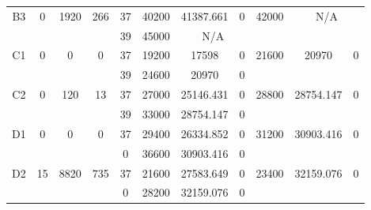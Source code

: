 \begin{sidewaystable}
\begin{tabular}{c||c|c|c||c|c|c|c||c|c|c}
         &
        
      \\
      \hline
      \multirow{2}{*}{B3} &
      \multirow{2}{*}{0} &
      \multirow{2}{*}{1920} &
      \multirow{2}{*}{266} &
      37 &
      40200 &
        41387.661 &
        0 &
      \multirow{2}{*}{42000} &
        \multicolumn{2}{c}{\multirow{2}{*}{N/A}}
      \\
      \cline{5-8}
       &
       &
       &
       &
      39 &
      45000 &
        \multicolumn{2}{|c||}{N/A} &
      
        
      \\
      \hline
      \multirow{2}{*}{C1} &
      \multirow{2}{*}{0} &
      \multirow{2}{*}{0} &
      \multirow{2}{*}{0} &
      37 &
      19200 &
        17598 &
        0 &
      \multirow{2}{*}{21600} &
        \multirow{2}{*}{20970} &
        \multirow{2}{*}{0}
      \\
      \cline{5-8}
       &
       &
       &
       &
      39 &
      24600 &
        20970 &
        0 &
      
         &
        
      \\
      \hline
      \multirow{2}{*}{C2} &
      \multirow{2}{*}{0} &
      \multirow{2}{*}{120} &
      \multirow{2}{*}{13} &
      37 &
      27000 &
        25146.431 &
        0 &
      \multirow{2}{*}{28800} &
        \multirow{2}{*}{28754.147} &
        \multirow{2}{*}{0}
      \\
      \cline{5-8}
       &
       &
       &
       &
      39 &
      33000 &
        28754.147 &
        0 &
      
         &
        
      \\
      \hline
      \multirow{2}{*}{D1} &
      \multirow{2}{*}{0} &
      \multirow{2}{*}{0} &
      \multirow{2}{*}{0} &
      37 &
      29400 &
        26334.852 &
        0 &
      \multirow{2}{*}{31200} &
        \multirow{2}{*}{30903.416} &
        \multirow{2}{*}{0}
      \\
      \cline{5-8}
       &
       &
       &
       &
      0 &
      36600 &
        30903.416 &
        0 &
      
         &
        
      \\
      \hline
      \multirow{2}{*}{D2} &
      \multirow{2}{*}{15} &
      \multirow{2}{*}{8820} &
      \multirow{2}{*}{735} &
      37 &
      21600 &
        27583.649 &
        0 &
      \multirow{2}{*}{23400} &
        \multirow{2}{*}{32159.076} &
        \multirow{2}{*}{0}
      \\
      \cline{5-8}
       &
       &
       &
       &
      0 &
      28200 &
        32159.076 &
        0 &
      

\end{tabular}
\end{sidewaystable}
